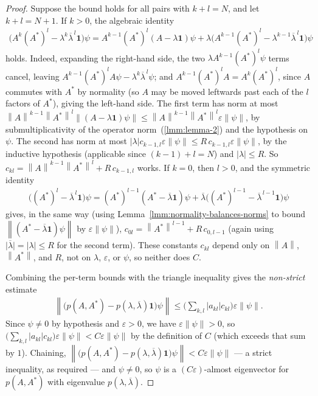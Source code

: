 \begin{proof}
Suppose the bound holds for all pairs with $k+l = N$, and let $k+l = N+1$. If $k > 0$, the algebraic identity
\begin{align}
    \big( A^k(A^*)^l - \lambda^k\overline\lambda^{\,l}\mathbf{1} \big)\psi
      = A^{k-1}(A^*)^l (A - \lambda\mathbf{1})\psi
      + \lambda\big( A^{k-1}(A^*)^l - \lambda^{k-1}\overline\lambda^{\,l}\mathbf{1} \big)\psi
\end{align}
holds. Indeed, expanding the right-hand side, the two $\lambda A^{k-1}(A^*)^l\psi$ terms cancel, leaving $A^{k-1}(A^*)^lA\psi - \lambda^k\overline\lambda^{\,l}\psi$; and $A^{k-1}(A^*)^lA = A^k(A^*)^l$, since $A$ commutes with $A^*$ by normality (so $A$ may be moved leftwards past each of the $l$ factors of $A^*$), giving the left-hand side. The first term has norm at most $\left\| A \right\|^{k-1}\left\| A^* \right\|^l \left\| (A-\lambda\mathbf{1})\psi \right\| \le \left\| A \right\|^{k-1}\left\| A^* \right\|^l \varepsilon \left\| \psi \right\|$, by submultiplicativity of the operator norm~(\ref{lmm:lemma-2}) and the hypothesis on $\psi$. The second has norm at most $\lvert \lambda \rvert c_{k-1,l}\varepsilon\left\| \psi \right\| \le R\, c_{k-1,l}\varepsilon\left\| \psi \right\|$, by the inductive hypothesis (applicable since $(k-1)+l = N$) and $\lvert \lambda \rvert \le R$. So $c_{kl} = \left\| A \right\|^{k-1}\left\| A^* \right\|^l + R\, c_{k-1,l}$ works. If $k = 0$, then $l > 0$, and the symmetric identity
\begin{align}
    \big( (A^*)^l - \overline\lambda^{\,l}\mathbf{1} \big)\psi
      = (A^*)^{l-1}(A^* - \overline\lambda\mathbf{1})\psi
      + \overline\lambda\big( (A^*)^{l-1} - \overline\lambda^{\,l-1}\mathbf{1} \big)\psi
\end{align}
gives, in the same way (using Lemma~\ref{lmm:normality-balances-norms} to bound $\left\| (A^*-\overline\lambda\mathbf{1})\psi \right\|$ by $\varepsilon\left\| \psi \right\|$), $c_{0l} = \left\| A^* \right\|^{l-1} + R\, c_{0,l-1}$ (again using $\lvert \overline\lambda \rvert = \lvert \lambda \rvert \le R$ for the second term). These constants $c_{kl}$ depend only on $\left\| A \right\|$, $\left\| A^* \right\|$, and $R$, not on $\lambda$, $\varepsilon$, or $\psi$, so neither does $C$.

Combining the per-term bounds with the triangle inequality gives the \textit{non-strict} estimate
\begin{align}
    \left\| \big( p(A,A^*) - p(\lambda,\overline\lambda)\mathbf{1} \big)\psi \right\| \le \Big( \sum_{k,l} \lvert a_{kl} \rvert c_{kl} \Big)\varepsilon\left\| \psi \right\|.
\end{align}
Since $\psi \ne 0$ by hypothesis and $\varepsilon > 0$, we have $\varepsilon\left\| \psi \right\| > 0$, so $\big(\sum_{k,l}\lvert a_{kl}\rvert c_{kl}\big)\varepsilon\left\| \psi \right\| < C\varepsilon\left\| \psi \right\|$ by the definition of $C$ (which exceeds that sum by $1$). Chaining, $\left\| \big( p(A,A^*) - p(\lambda,\overline\lambda)\mathbf{1} \big)\psi \right\| < C\varepsilon\left\| \psi \right\|$ — a strict inequality, as required — and $\psi \ne 0$, so $\psi$ is a $(C\varepsilon)$-almost eigenvector for $p(A,A^*)$ with eigenvalue $p(\lambda,\overline\lambda)$.
\end{proof}

